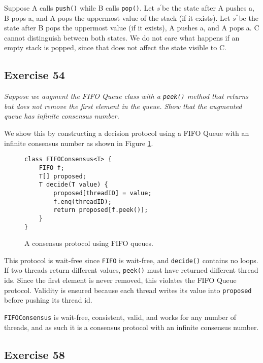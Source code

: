 \documentclass[a4paper,10pt]{article}
\newcommand{\Sp}{$s^{'}$}
\newcommand{\Spp}{$s^{''}$}
\begin{document}
Suppose A calls \lstinline|push()| while B calls \lstinline|pop()|. Let \Sp be the state after A pushes a, B pops a, and A pops the uppermost value of the stack (if it exists). Let \Spp be the state after B pops the uppermost value (if it exists), A pushes a, and A pops a. C cannot distinguish between both states. We do not care what happens if an empty stack is popped, since that does not affect the state visible to C.

\vspace{3mm}

\subsection{Exercise 54}

\emph{Suppose we augment the FIFO Queue class with a \lstinline|peek()| method
that returns but does not remove the first element in the queue. Show that the
augmented queue has infinite consensus number.}

\vspace{3mm}

We show this by constructing a decision protocol using a FIFO Queue with an infinite consensus number as shown in Figure \ref{fig:fifoconsensus}.

\begin{figure}
\begin{lstlisting}
class FIFOConsensus<T> {
    FIFO f;
    T[] proposed;
    T decide(T value) {
        proposed[threadID] = value;
        f.enq(threadID);
        return proposed[f.peek()];
    }
}
\end{lstlisting}
\caption{A consensus protocol using FIFO queues.}
\label{fig:fifoconsensus}
\end{figure}

This protocol is wait-free since \lstinline|FIFO| is wait-free, and \lstinline|decide()| contains no loops. If two threads return different values,
\lstinline|peek()| must have returned different thread ids. Since the first element is never removed, this violates the FIFO Queue protocol. Validity is ensured because each thread writes its value into \lstinline|proposed| before pushing its thread id.

\lstinline|FIFOConsensus| is wait-free, consistent, valid, and works for any number of threads, and as such it is a consensus protocol with an infinite consensus number.

\vspace{3mm}

\subsection{Exercise 58}
\end{document}
